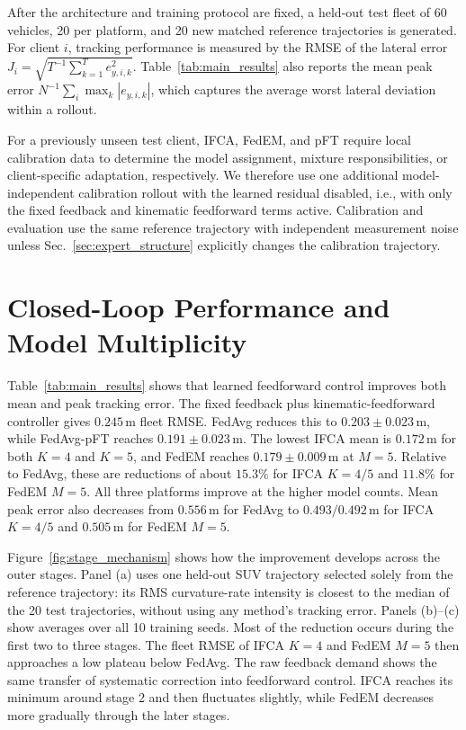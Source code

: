 After the architecture and training protocol are fixed, a held-out test fleet of 60 vehicles, 20 per platform, and 20 new matched reference trajectories is generated.
For client $i$, tracking performance is measured by the RMSE of the lateral error $J_i=\sqrt{T^{-1}\sum_{k=1}^{T} e_{y,i,k}^{2}}$.
Table~\ref{tab:main_results} also reports the mean peak error $N^{-1}\sum_i\max_k|e_{y,i,k}|$, which captures the average worst lateral deviation within a rollout.

For a previously unseen test client, IFCA, FedEM, and pFT require local calibration data to determine the model assignment, mixture responsibilities, or client-specific adaptation, respectively.
We therefore use one additional model-independent calibration rollout with the learned residual disabled, i.e., with only the fixed feedback and kinematic feedforward terms active.
Calibration and evaluation use the same reference trajectory with independent measurement noise unless Sec.~\ref{sec:expert_structure} explicitly changes the calibration trajectory.



\section{Closed-Loop Performance and Model Multiplicity}
\label{sec:performance}

Table~\ref{tab:main_results} shows that learned feedforward control improves both mean and peak tracking error.
The fixed feedback plus kinematic-feedforward controller gives $0.245\,\mathrm{m}$ fleet RMSE.
FedAvg reduces this to $0.203\pm0.023\,\mathrm{m}$, while FedAvg-pFT reaches $0.191\pm0.023\,\mathrm{m}$.
The lowest IFCA mean is $0.172\,\mathrm{m}$ for both $K=4$ and $K=5$, and FedEM reaches $0.179\pm0.009\,\mathrm{m}$ at $M=5$.
Relative to FedAvg, these are reductions of about $15.3\%$ for IFCA $K=4/5$ and $11.8\%$ for FedEM $M=5$.
All three platforms improve at the higher model counts.
Mean peak error also decreases from $0.556\,\mathrm{m}$ for FedAvg to $0.493/0.492\,\mathrm{m}$ for IFCA $K=4/5$ and $0.505\,\mathrm{m}$ for FedEM $M=5$.

Figure~\ref{fig:stage_mechanism} shows how the improvement develops across the outer stages.
Panel (a) uses one held-out SUV trajectory selected solely from the reference trajectory: 
its RMS curvature-rate intensity is closest to the median of the 20 test trajectories, without using any method's tracking error.
Panels (b)--(c) show averages over all 10 training seeds.
Most of the reduction occurs during the first two to three stages.
The fleet RMSE of IFCA $K=4$ and FedEM $M=5$ then approaches a low plateau below FedAvg.
The raw feedback demand shows the same transfer of systematic correction into feedforward control. 
IFCA reaches its minimum around stage 2 and then fluctuates slightly, while FedEM decreases more gradually through the later stages.

